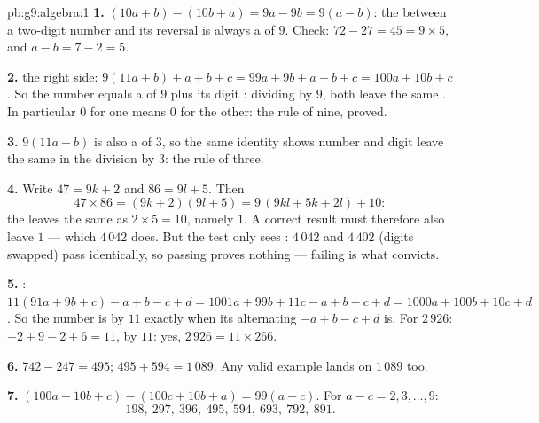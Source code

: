 \begin{solution}{pb:g9:algebra:1}
\textbf{1.} $(10a + b) - (10b + a) = 9a - 9b = 9(a - b)$: the
 between a two-digit number and its reversal is always
a  of $9$. Check: $72 - 27 = 45 = 9 \times 5$, and
$a - b = 7 - 2 = 5$.

\textbf{2.}  the right side:
$9(11a + b) + a + b + c = 99a + 9b + a + b + c
= 100a + 10b + c$. So the number equals a  of $9$ plus
its digit : dividing by $9$, both leave the same .
In particular  $0$ for one means  $0$ for the
other: the rule of nine, proved.

\textbf{3.} $9(11a + b)$ is also a  of $3$, so the same
identity shows number and digit  leave the same  in
the division by $3$: the rule of three.

\textbf{4.} Write $47 = 9k + 2$ and $86 = 9l + 5$. Then
\[
47 \times 86 = (9k + 2)(9l + 5)
= 9\,(9kl + 5k + 2l) + 10 :
\]
the  leaves the same  as $2 \times 5 = 10$,
namely $1$. A correct result must therefore also leave 
$1$ --- which $4\,042$ does. But the test only sees :
$4\,042$ and $4\,402$ (digits swapped) pass identically, so
passing proves nothing --- failing is what convicts.

\textbf{5.} : $11(91a + 9b + c) - a + b - c + d
= 1001a + 99b + 11c - a + b - c + d
= 1000a + 100b + 10c + d$. So the number is  by $11$
exactly when its alternating  $-a + b - c + d$ is. For
$2\,926$: $-2 + 9 - 2 + 6 = 11$,  by $11$: yes,
$2\,926 = 11 \times 266$.

\textbf{6.} $742 - 247 = 495$; $495 + 594 = 1\,089$. Any valid
example lands on $1\,089$ too.

\textbf{7.} $(100a + 10b + c) - (100c + 10b + a) = 99(a - c)$.
For $a - c = 2, 3, \dots, 9$:
\[
198,\ 297,\ 396,\ 495,\ 594,\ 693,\ 792,\ 891 .
\]


\end{solution}
